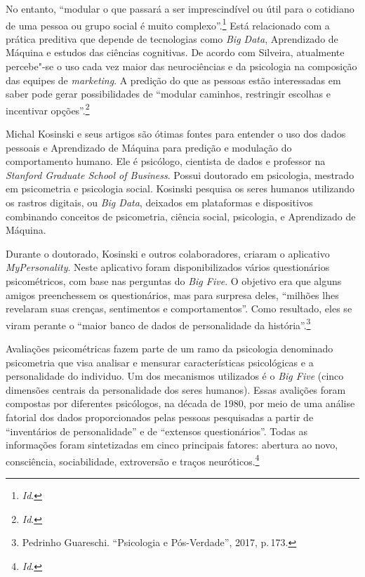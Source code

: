 No entanto, ``modular o que passará a ser imprescindível ou útil para o
cotidiano de uma pessoa ou grupo social é muito complexo''.\footnote{\textit{Id}.} Está relacionado com a prática preditiva que depende
de tecnologias como \textit{Big Data}, Aprendizado de Máquina e estudos
das ciências cognitivas. De acordo com Silveira, atualmente percebe"-se
o uso cada vez maior das neurociências e da psicologia na composição das
equipes de \textit{marketing}. A predição do que as pessoas estão interessadas em
saber pode gerar possibilidades de ``modular caminhos, restringir
escolhas e incentivar opções''.\footnote{\textit{Id}.}

Michal Kosinski e seus artigos são ótimas fontes para entender o uso dos
dados pessoais e Aprendizado de Máquina para predição e modulação do
comportamento humano. Ele é psicólogo, cientista de dados e professor na
\textit{Stanford Graduate School of Business}. Possui doutorado em
psicologia, mestrado em psicometria e psicologia social. Kosinski
pesquisa os seres humanos utilizando os rastros digitais, ou \textit{Big
Data}, deixados em plataformas e dispositivos combinando conceitos de
psicometria, ciência social, psicologia, e Aprendizado de Máquina.

Durante o doutorado, Kosinski e outros colaboradores, criaram o
aplicativo \textit{MyPersonality}. Neste aplicativo foram disponibilizados
vários questionários psicométricos, com base nas perguntas do \textit{Big
Five}. O objetivo era que alguns amigos preenchessem os questionários,
mas para surpresa deles, ``milhões lhes revelaram suas crenças,
sentimentos e comportamentos''. Como resultado, eles se viram perante o
``maior banco de dados de personalidade da história''.\footnote{Pedrinho Guareschi. ``Psicologia e Pós-Verdade'', 2017, p.\,173.}

Avaliações psicométricas fazem parte de um ramo da psicologia denominado
psicometria que visa analisar e mensurar características psicológicas e a personalidade do individuo. Um dos
mecanismos utilizados é o \textit{Big Five} (cinco dimensões centrais da
personalidade dos seres humanos). Essas avalições foram compostas por
diferentes psicólogos, na década de 1980, por meio de uma análise
fatorial dos dados proporcionados pelas pessoas pesquisadas a partir de
``inventários de personalidade'' e de ``extensos questionários''. Todas
as informações foram sintetizadas em cinco principais fatores: abertura
ao novo, consciência, sociabilidade, extroversão e traços neuróticos.\footnote{\textit{Id}.}

